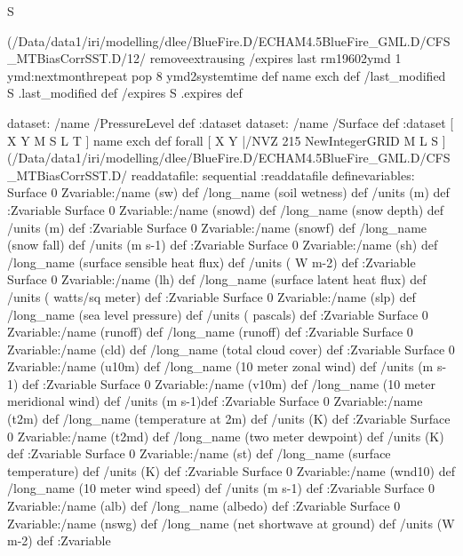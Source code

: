 S
{(/Data/data1/iri/modelling/dlee/BlueFire.D/ECHAM4.5BlueFire_GML.D/CFS_MTBiasCorrSST.D/12/%
removeextrausing
/expires last rm19602ymd
       1 {ymd:nextmonth}repeat
       pop
      8 ymd2systemtime
     def
name exch def
/last_modified S .last_modified def
/expires S .expires def
\begin{ingrid}

dataset: /name /PressureLevel def :dataset
dataset: /name /Surface def :dataset
[ X Y M S L T ] { name exch def } forall
[ X Y |/NVZ 215  NewIntegerGRID M L S ]
(/Data/data1/iri/modelling/dlee/BlueFire.D/ECHAM4.5BlueFire_GML.D/CFS_MTBiasCorrSST.D/%
readdatafile:
sequential
:readdatafile
definevariables:
Surface 0 Zvariable:/name (sw) def /long_name (soil wetness)  def /units (m) def :Zvariable
Surface 0 Zvariable:/name (snowd) def /long_name (snow depth) def /units (m) def :Zvariable
Surface 0 Zvariable:/name (snowf) def /long_name (snow fall)  def /units (m s-1) def :Zvariable
Surface 0 Zvariable:/name (sh) def /long_name (surface sensible heat flux) def /units ( W m-2) def :Zvariable
Surface 0 Zvariable:/name (lh) def /long_name (surface latent heat flux) def /units ( watts/sq meter) def :Zvariable
Surface 0 Zvariable:/name (slp) def /long_name (sea level pressure) def /units ( pascals) def :Zvariable
Surface 0 Zvariable:/name (runoff) def /long_name (runoff) def :Zvariable
Surface 0 Zvariable:/name (cld) def /long_name (total cloud cover) def :Zvariable
Surface 0 Zvariable:/name (u10m) def /long_name (10 meter zonal wind) def /units (m s-1) def :Zvariable
Surface 0 Zvariable:/name (v10m) def /long_name (10 meter meridional wind) def /units (m s-1)def :Zvariable
Surface 0 Zvariable:/name (t2m) def /long_name (temperature at 2m) def /units (K) def :Zvariable
Surface 0 Zvariable:/name (t2md) def /long_name (two meter dewpoint) def /units (K) def :Zvariable
Surface 0 Zvariable:/name (st) def /long_name (surface temperature) def /units (K) def :Zvariable
Surface 0 Zvariable:/name (wnd10) def /long_name (10 meter wind speed) def /units (m s-1) def :Zvariable
Surface 0 Zvariable:/name (alb) def /long_name (albedo) def :Zvariable
Surface 0 Zvariable:/name (nswg) def /long_name (net shortwave at ground) def /units (W m-2) def :Zvariable

\end{ingrid}}
